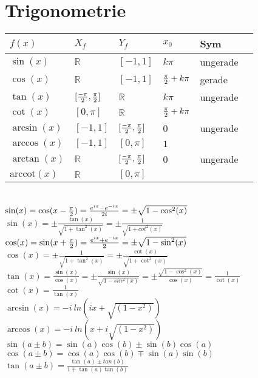 \section{Trigonometrie}
\begin{tabular}{l|l|l|l|l|l}
 $f(x)$ &  $X_{f}$ & $Y_{f}$ & $x_0$ & Sym  \\\hline
$\sin(x)$ &  $\mathbb{R}$ & $[-1,1]$ & $k\pi$ & ungerade\\
$\cos(x)$ & $\mathbb{R}$ & $[-1,1]$ & ${\pi\over 2} + k\pi$ & gerade\\
$\tan(x)$ & $[{-\pi\over 2},{\pi\over 2}]$ & $\mathbb{R}$ & $k\pi$ & ungerade\\
$\cot(x)$ & $[0,\pi]$ & $\mathbb{R}$ & ${\pi\over 2} + k\pi$ & \\
$\arcsin(x)$ & $[-1,1]$ & $[{-\pi\over 2},{\pi\over 2}]$ & 0 & ungerade\\
$\arccos(x)$ & $[-1,1]$ & $[0,\pi]$ & $1$ & \\
$\arctan(x)$ & $\mathbb{R}$ & $[{-\pi\over 2},{\pi\over 2}]$ & 0 & ungerade\\
$\text{arccot}(x)$ & $\mathbb{R}$ & $[0,\pi]$ & & \\
\end{tabular}\\


$\sin(x)=\cos(x-{\pi\over2})=\frac{e^{ix}-e^{-ix}}{2i}=\pm\sqrt{1-\cos^2(x)}$\\
$\sin(x)=\pm\frac{\tan(x)}{\sqrt{1+\tan^2(x)}}=\pm\frac{1}{\sqrt{1+cot^2(x)}}$ \\
$\cos(x)=\sin(x+{\pi\over2})=\frac{e^{ix}+e^{-ix}}{2}=\pm\sqrt{1-\sin^2(x)}$\\
$\cos(x)=\pm\frac{1}{\sqrt{1+\tan^2(x)}}=\pm\frac{\cot(x)}{\sqrt{1+\cot^2(x)}}$\\
$\tan(x)=\frac{\sin(x)}{\cos(x)}=\pm\frac{\sin(x)}{\sqrt{1-sin^2(x)}}=\pm\frac{\sqrt{1-\cos^2(x)}}{\cos(x)}=\frac{1}{\cot(x)}$\\
$\cot(x)=\frac{1}{\tan(x)}$\\
%
$\arcsin(x)=-i~ln(ix+\sqrt{(1-x^2)})$\\
$\arccos(x)=-i~ln(x+i\sqrt{(1-x^2)})$\\
$\sin(a\pm b)=\sin(a)\cos(b) \pm \sin(b)\cos(a)$\\
$\cos(a\pm b)=\cos(a)\cos(b) \mp \sin(a)\sin(b)$\\
$\tan(a\pm b)=\frac{\tan(a)\pm tan(b)}{1 \mp \tan(a)\tan(b)}$\\


